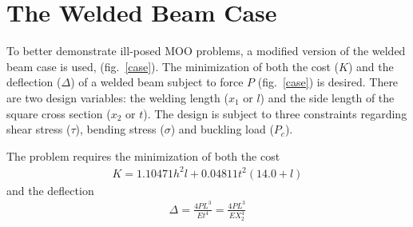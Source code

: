 \FloatBarrier
\section{The Welded Beam Case}

To better demonstrate ill-posed MOO problems, a modified version of the welded beam case \cite{coello2000use} is used, (fig.\ \ref{case}).  The minimization of both the cost ($K$) and the deflection ($\Delta$) of a welded beam subject to force $P$ (fig.\ \ref{case}) is desired. There are two design variables: the welding length ($x_1$ or $l$)  and the side length of the square cross section ($x_2$ or $t$). The design is subject to three constraints regarding shear stress ($\tau$), bending stress ($\sigma$) and buckling load ($P_c$).    



The problem requires the minimization of both the cost
\begin{eqnarray}\nonumber
   K = 1.10471h^2l+0.04811t^2(14.0+l) %
   \label{Cost} 
\end{eqnarray}
and the deflection
\begin{eqnarray}
   \Delta = \frac{4PL^3}{Et^4} = \frac{4PL^3}{EX_2^4}
   \label{Deflection} 
\end{eqnarray}

